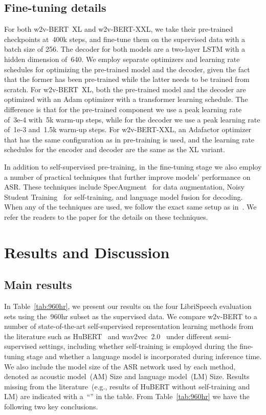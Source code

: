 \documentclass{article}
\begin{document}
\subsection{Fine-tuning details}
 For both w2v-BERT~XL and w2v-BERT-XXL, we take their pre-trained checkpoints at~400k steps, and fine-tune them on the supervised data with a batch size of 256.
The decoder for both models are a two-layer LSTM with a hidden dimension of~640.
We employ separate optimizers and learning rate schedules for optimizing the pre-trained model and the decoder, given the fact that the former has been pre-trained while the latter needs to be trained from scratch.
For w2v-BERT~XL, both the pre-trained model and the decoder are optimized with an Adam optimizer with a transformer learning schedule.
The difference is that for the pre-trained component we use a peak learning rate of~3e-4 with~5k warm-up steps, while for the decoder we use a peak learning rate of~1e-3 and~1.5k warm-up steps.
For w2v-BERT-XXL, an Adafactor optimizer that has the same configuration as in pre-training is used, and the learning rate schedules for the encoder and decoder are the same as the XL variant.


In addition to self-supervised pre-training, in the fine-tuning stage we also employ a number of practical techniques that further improve models' performance on ASR.
These techniques include SpecAugment~\cite{park2019specaugment,park2020specaugment} for data augmentation, Noisy Student Training~\cite{park2020improved} for self-training, and language model fusion for decoding.
When any of the techniques are used, we follow the exact same setup as in~\cite{zhang2020pushing}.
We refer the readers to the paper for the details on these techniques.


\section{Results and Discussion}
\label{sec:results}

\subsection{Main results}
In Table~\ref{tab:960hr}, we present our results on the four LibriSpeech evaluation sets using the~960hr subset as the supervised data.
We compare w2v-BERT to a number of state-of-the-art self-supervised representation learning methods from the literature such as HuBERT~\cite{hsu2021hubert} and wav2vec~2.0~\cite{baevski2020wav2vec} under different semi-supervised settings, including whether self-training is employed during the fine-tuning stage and whether a language model is incorporated during inference time.
We also include the model size of the ASR network used by each method, denoted as acoustic model~(AM) Size and language model~(LM) Size.
Results missing from the literature~(e.g., results of HuBERT without self-training and LM) are indicated with a~``'' in the table.
From Table~\ref{tab:960hr} we have the following two key conclusions.
\end{document}
